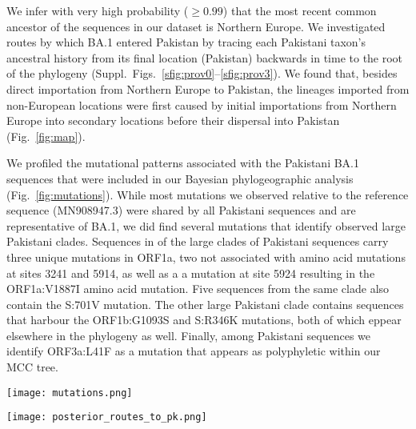 We infer with very high probability ($ \geq 0.99$) that the most recent common ancestor of the sequences in our dataset is Northern Europe.
We investigated routes by which BA.1 entered Pakistan by tracing each Pakistani taxon's ancestral history from its final location (Pakistan) backwards in time to the root of the phylogeny (Suppl.~Figs.~\ref{sfig:prov0}--\ref{sfig:prov3}).
We found that, besides direct importation from Northern Europe to Pakistan, the lineages imported from non-European locations were first caused by initial importations from Northern Europe into secondary locations before their dispersal into Pakistan (Fig.~\ref{fig:map}).

We profiled the mutational patterns associated with the Pakistani BA.1 sequences that were included in our Bayesian phylogeographic analysis (Fig.~\ref{fig:mutations}).
While most mutations we observed relative to the reference sequence (MN908947.3) were shared by all Pakistani sequences and are representative of BA.1, we did find several mutations that identify observed large Pakistani clades.
Sequences in of the large clades of Pakistani sequences carry three unique mutations in ORF1a, two not associated with amino acid mutations at sites 3241 and 5914, as well as a a mutation at site 5924 resulting in the ORF1a:V1887I amino acid mutation.
Five sequences from the same clade also contain the S:701V mutation.
The other large Pakistani clade contains sequences that harbour the ORF1b:G1093S and S:R346K mutations, both of which eppear elsewhere in the phylogeny as well.
Finally, among Pakistani sequences we identify ORF3a:L41F as a mutation that appears as polyphyletic within our MCC tree. 


\begin{figure*}[!ht]
    \centering
    \texttt{[image: mutations.png]}
    \caption{Condensed alignment of SARS-CoV-2 BA.1 sequences from Pakistan showing sites that are polymorphic within the Pakistan BA.1 dataset and shared by at least two sequences from Pakistan. The tree on the right is based on the MCC tree but is reduced down to just the BA.1 sequences from Pakistan while preserving their relative phylogenetic positions.}
    \label{fig:mutations}
\end{figure*}

\begin{figure*}[ht]
   \centering
   \texttt{[image: posterior\_routes\_to\_pk.png]}
    \caption{Map representing routes by which BA.1 is inferred to enter Pakistan tracing from the most recent common ancestor of our dataset to Pakistani taxa. Inferred migration events that lead directly into Pakistan are represented in dark red, while migrations to a location other than Pakistan that then seed a downstream importation to Pakistan (indirect importations) are illustrated in lighter red.}
    \label{fig:map}
\end{figure*}



